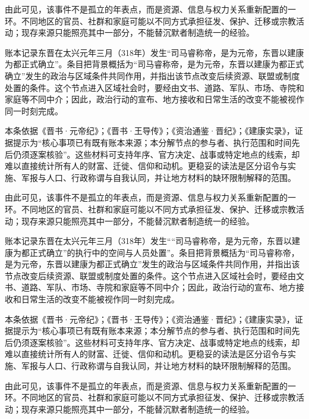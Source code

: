 由此可见，该事件不是孤立的年表点，而是资源、信息与权力关系重新配置的一环。不同地区的官员、社群和家庭可能以不同方式承担征发、保护、迁移或宗教活动；现存来源只能照亮其中一部分，不能替沉默者制造统一的经验。

账本记录东晋在太兴元年三月（318年）发生“司马睿称帝，是为元帝，东晋以建康为都正式确立”。条目把背景概括为“司马睿称帝，是为元帝，东晋以建康为都正式确立”发生的政治与区域条件共同作用，并指出该节点改变后续资源、联盟或制度处置的条件。这个节点进入区域社会时，要经由文书、道路、军队、市场、寺院和家庭等不同中介；因此，政治行动的宣布、地方接收和日常生活的改变不能被视作同一时刻完成。

本条依据《晋书·元帝纪》；《晋书·王导传》；《资治通鉴·晋纪》；《建康实录》，证据提示为“核心事项已有既有账本来源；本分解节点的参与者、执行范围和时间先后仍须逐案核验”。这些材料可支持年序、官方决定、战事或特定地点的线索，却难以直接统计所有人的财富、迁徙、信仰和动机。更稳妥的读法是区分诏令与实施、军报与人口、行政称谓与自我认同，并让地方材料的缺环限制解释的范围。

由此可见，该事件不是孤立的年表点，而是资源、信息与权力关系重新配置的一环。不同地区的官员、社群和家庭可能以不同方式承担征发、保护、迁移或宗教活动；现存来源只能照亮其中一部分，不能替沉默者制造统一的经验。

账本记录东晋在太兴元年三月（318年）发生““司马睿称帝，是为元帝，东晋以建康为都正式确立”的执行中的空间与人员处置”。条目把背景概括为“司马睿称帝，是为元帝，东晋以建康为都正式确立”发生的政治与区域条件共同作用，并指出该节点改变后续资源、联盟或制度处置的条件。这个节点进入区域社会时，要经由文书、道路、军队、市场、寺院和家庭等不同中介；因此，政治行动的宣布、地方接收和日常生活的改变不能被视作同一时刻完成。

本条依据《晋书·元帝纪》；《晋书·王导传》；《资治通鉴·晋纪》；《建康实录》，证据提示为“核心事项已有既有账本来源；本分解节点的参与者、执行范围和时间先后仍须逐案核验”。这些材料可支持年序、官方决定、战事或特定地点的线索，却难以直接统计所有人的财富、迁徙、信仰和动机。更稳妥的读法是区分诏令与实施、军报与人口、行政称谓与自我认同，并让地方材料的缺环限制解释的范围。

由此可见，该事件不是孤立的年表点，而是资源、信息与权力关系重新配置的一环。不同地区的官员、社群和家庭可能以不同方式承担征发、保护、迁移或宗教活动；现存来源只能照亮其中一部分，不能替沉默者制造统一的经验。
